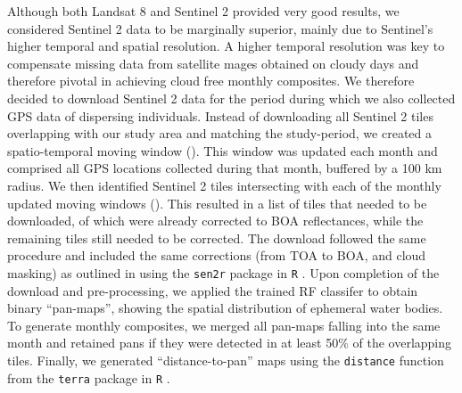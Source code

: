 \documentclass[../FinalThesis.tex]{subfiles}
\begin{document}
Although both Landsat 8 and Sentinel 2 provided very good results, we considered
Sentinel 2 data to be marginally superior, mainly due to Sentinel's higher
temporal and spatial resolution. A higher temporal resolution was key to
compensate missing data from satellite mages obtained on cloudy days and
therefore pivotal in achieving cloud free monthly composites. We therefore
decided to download Sentinel 2 data for the period during which we also
collected GPS data of dispersing individuals. Instead of downloading all
Sentinel 2 tiles overlapping with our study area and matching the study-period,
we created a spatio-temporal moving window (). This window
was updated each month and comprised all GPS locations collected during that
month, buffered by a 100 km radius. We then identified Sentinel 2 tiles
intersecting with each of the monthly updated moving windows
(). This resulted in a list of
 tiles that needed to be downloaded,
 of which were already corrected to BOA
reflectances, while the remaining  tiles
still needed to be corrected. The download followed the same procedure and
included the same corrections (from TOA to BOA, and cloud masking) as outlined
in  using the \texttt{sen2r} package in \texttt{R}
\citep{Ranghetti.2020}. Upon completion of the download and pre-processing, we
applied the trained RF classifer to obtain binary ``pan-maps'', showing the
spatial distribution of ephemeral water bodies. To generate monthly composites,
we merged all pan-maps falling into the same month and retained pans if they
were detected in at least 50\% of the overlapping tiles. Finally, we generated
``distance-to-pan'' maps using the \texttt{distance} function from the
\texttt{terra} package in \texttt{R} \citep{Hijmans.2024}.
\end{document}
